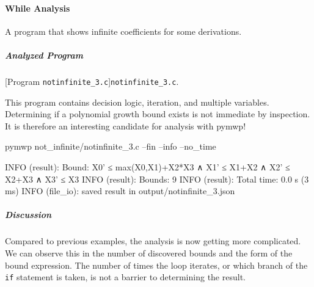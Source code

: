 \paragraph{While Analysis}\label{while-analysis}
A program that shows infinite coefficients for some derivations.

\subparagraph*{Analyzed Program}

\begin{center}
\begin{minipage}{\textwidth}
\captionsetup{type=lstlisting}
[Program \texttt{notinfinite\_3.c}]{\texttt{notinfinite\_3.c}.}
\label{lst:notinfinite3}
\end{minipage}
\end{center}

This program contains decision logic, iteration, and multiple variables.
Determining if a polynomial growth bound exists is not immediate by inspection.
It is therefore an interesting candidate for analysis with pymwp!

\begin{center}
\begin{minipage}{\textwidth}
\captionsetup{type=lstlisting}
\begin{cmdlisting}[label={lst:ex3-run-cmd}]
pymwp not_infinite/notinfinite_3.c --fin --info --no_time
\end{cmdlisting}
\end{minipage}
\end{center}

\begin{center}
\begin{minipage}{\textwidth}
\begin{outlisting}[label={lst:ex3-output}]
INFO (result): Bound: X0' ≤ max(X0,X1)+X2*X3 ∧ X1' ≤ X1+X2 ∧ X2' ≤ X2+X3 ∧ X3' ≤ X3
INFO (result): Bounds: 9
INFO (result): Total time: 0.0 s (3 ms)
INFO (file_io): saved result in output/notinfinite_3.json
\end{outlisting}
\end{minipage}
\end{center}

\subparagraph*{Discussion}\label{discussion}

Compared to previous examples, the analysis is now getting more complicated.
We can observe this in the number of discovered bounds and the form of the bound expression.
The number of times the loop iterates, or which branch of the \texttt{if} statement is taken, is not a barrier to determining the result.

